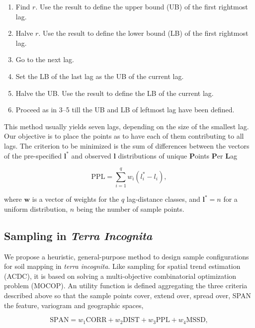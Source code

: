 \begin{enumerate}
 \item Find $r$. Use the result to define the upper bound (UB) of the first rightmost lag.
 \item Halve $r$. Use the result to define the lower bound (LB) of the first rightmost lag.
 \item Go to the next lag.
 \item Set the LB of the last lag as the UB of the current lag.
 \item Halve the UB. Use the result to define the LB of the current lag.
 \item Proceed as in 3--5 till the UB and LB of leftmost lag have been defined.
\end{enumerate}

This method usually yields seven lags, depending on the size of the smallest lag. Our objective is to place 
the 
points as to have each of them contributing to all lags. The criterion to be minimized is the sum of 
differences between the vectors of the pre-specified $\boldsymbol{l}^*$ and observed $\boldsymbol{l}$ 
distributions of unique \textbf{P}oints \textbf{P}er \textbf{L}ag

\begin{equation}
 \text{PPL} = \sum_{i = 1}^{q} w_i (l_i^* - l_i),
\end{equation}\label{eq:chap08-ppl}

\noindent where $\boldsymbol{w}$ is a vector of weights for the $q$ lag-distance classes, and 
$\boldsymbol{l}^* = n$ for a uniform distribution, $n$ being the number of sample points.

\subsection{Sampling in \emph{Terra Incognita}}

We propose a heuristic, general-purpose method to design sample configurations for soil mapping in \emph{terra 
incognita}. Like sampling for spatial trend estimation (ACDC), it is based on solving a multi-objective 
combinatorial optimization problem (MOCOP). An utility function is defined aggregating the three criteria 
described above so that the sample points cover, extend over, spread over, SPAN the feature, variogram 
and geographic spaces,

\begin{equation}
\text{SPAN} = w_1 \text{CORR} + w_2 \text{DIST} + w_3 \text{PPL} + w_4 \text{MSSD}, 
\end{equation}\label{eq:chap08-span}

